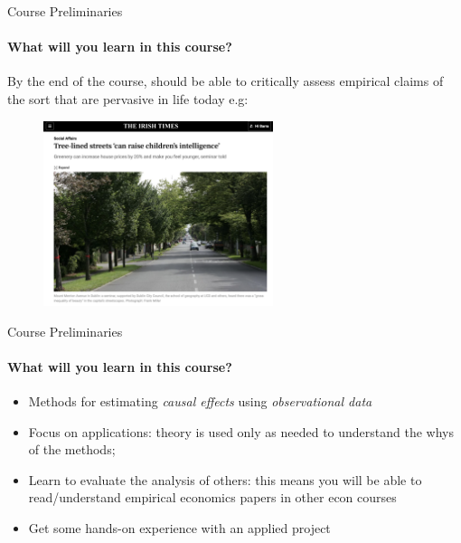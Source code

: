 \documentclass[11pt,english]{beamer}
\begin{document}
\begin{frame}{Course Preliminaries}
	\framesubtitle{What will you learn in this course?}
	\vspace{0.5cm}
	By the end of the course, should be able to critically assess empirical claims of the sort that are pervasive in life today e.g:
	\pause 
	\begin{figure}
		\centering
		\includegraphics[width=0.6\textwidth, trim=0 0 0 0, clip]{tree-lined-streets.png} %
	\end{figure}
	
	\end{frame}
	
\begin{frame}{Course Preliminaries}
	\framesubtitle{What will you learn in this course?}
	\begin{itemize}
		\item Methods for estimating \textit{causal effects} using \textit{observational data}
		\item Focus on applications: theory is used only as needed to understand the whys of the methods;
		\item Learn to evaluate the analysis of others: this means you will be able to read/understand empirical economics papers in other econ courses
		\item Get some hands-on experience with an applied project  
		
	\end{itemize}


\end{frame}
\end{document}
